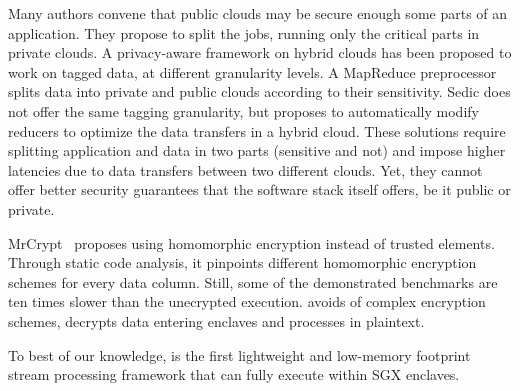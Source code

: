 Many authors convene that public clouds may be secure enough some parts of an application.
They propose to split the jobs, running only the critical parts in private clouds.
A privacy-aware framework on hybrid clouds \cite{xu2015framework} has been proposed to work on tagged data, at different granularity levels.
A MapReduce preprocessor splits data into private and public clouds according to their sensitivity.
Sedic \cite{zhang2011sedic} does not offer the same tagging granularity, but proposes to automatically modify reducers to optimize the data transfers in a hybrid cloud.
These solutions require splitting application and data in two parts (sensitive and not) and impose higher latencies due to data transfers between two different clouds.
Yet, they cannot offer better security guarantees that the software stack itself offers, be it public or private.

MrCrypt \cite{tetali2013mrcrypt} proposes using homomorphic encryption instead of trusted elements.
Through static code analysis, it pinpoints different homomorphic encryption schemes for every data column.
Still, some of the demonstrated benchmarks are ten times slower than the unecrypted execution.
\SYS{} avoids of complex encryption schemes, decrypts data entering enclaves and processes in plaintext.

To best of our knowledge, \SYS{} is the first lightweight and low-memory footprint stream processing framework that can fully execute within SGX enclaves.
